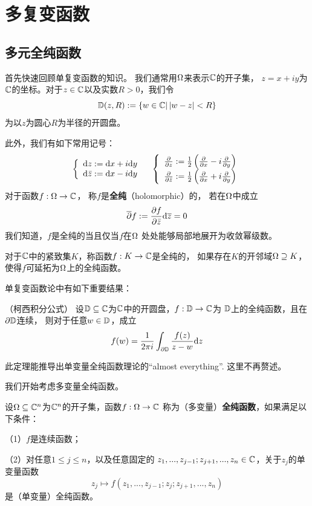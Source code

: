 \chapter{多复变函数}
\section{多元全纯函数}
首先快速回顾单复变函数的知识。
我们通常用$\Omega$来表示$\mathbb{C}$的开子集，
$z=x+iy$为$\mathbb{C}$的坐标。对于$z\in\mathbb{C}$以及实数$R>0$，我们令
$$\mathbb{D}(z,R):=\{w\in\mathbb{C}|\,|w-z|< R\}$$
为以$z$为圆心$R$为半径的开圆盘。

此外，我们有如下常用记号：
$$\left\{\begin{array}{l}
\mathrm{d} z:=\mathrm{d} x + i\mathrm{d} y\\
\mathrm{d} \bar{z} := \mathrm{d} x- i\mathrm{d} y
\end{array}\right.\quad
\left\{\begin{array}{l}
\frac{\partial } {\partial z}:=\frac{1}{2}
\left(\frac{\partial } {\partial x}-i\frac{\partial } {\partial y}\right)\\
\frac{\partial } {\partial \bar{z}} := \frac{1}{2}
\left(\frac{\partial } {\partial x}+i\frac{\partial } {\partial y}\right)
\end{array}\right.
$$
对于函数$f:\Omega\to\mathbb{C}$，
称$f$是\textbf{全纯}（holomorphic）的，
若在$\Omega$中成立
$$\overline{\partial} f:=\frac{\partial f} {\partial \bar{z}}\mathrm{d}\overline{z}=0$$
我们知道，$f$是全纯的当且仅当$f$在$\Omega$
处处能够局部地展开为收敛幂级数。

对于$\mathbb{C}$中的紧致集$K$，称函数$f:K\to\mathbb{C}$是全纯的，
如果存在$K$的开邻域$\Omega\supseteq K$，
使得$f$可延拓为$\Omega$上的全纯函数。

单复变函数论中有如下重要结果：

\begin{thm}（柯西积分公式）
设$\mathbb{D}\subseteq\mathbb{C}$为$\mathbb{C}$中的开圆盘，$f:\mathbb{D}\to\mathbb{C}$为
$\mathbb{D}$上的全纯函数，且在$\partial\mathbb{D}$连续，
则对于任意$w\in\mathbb{D}$，成立
$$f(w)=\frac{1}{2\pi i}\int_{\partial\mathbb{D}}\frac{f(z)}{z-w}\mathrm{d} z$$
\end{thm}

此定理能推导出单变量全纯函数理论的“almost everything”.
这里不再赘述。

我们开始考虑多变量全纯函数。

\begin{definition}
设$\Omega\subseteq\mathbb{C}^n$为$\mathbb{C}^n$的开子集，函数$f:\Omega\to\mathbb{C}$
称为（多变量）\textbf{全纯函数}，如果满足以下条件：

（1）$f$是连续函数；

（2）对任意$1\leq j\leq n$，以及任意固定的
$z_1,...,z_{j-1};z_{j+1},...,z_n\in\mathbb{C}$，关于$z_j$的单变量函数
$$z_j\mapsto f(z_1,...,z_{j-1};z_j;z_{j+1},...,z_n)$$
是（单变量）全纯函数。
\end{definition}

